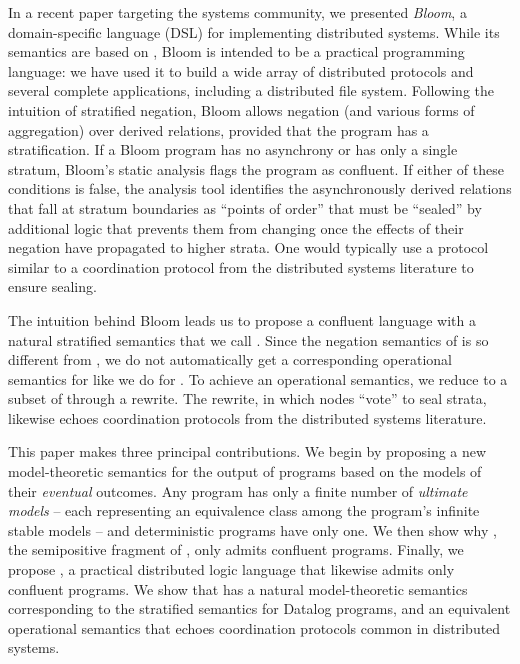 In a recent paper targeting the systems community, we presented \emph{Bloom}, a domain-specific language (DSL) for implementing distributed 
systems.  While its semantics are based on \lang, Bloom is intended to be a practical programming language: we have used it to build a wide array of distributed protocols and several complete
applications, including a distributed file system.
Following the intuition of stratified negation, Bloom allows negation (and various forms of aggregation) over derived relations, provided that the program has a stratification.
If a Bloom program has no asynchrony or has only a single stratum, Bloom's static analysis flags the 
program as confluent.  If either of these conditions is false, the analysis tool identifies the asynchronously derived relations that fall 
at stratum boundaries as ``points of order'' that must be ``sealed'' by additional logic that prevents them from changing once the effects 
of their negation have propagated to higher strata.  One would typically use a protocol similar to a coordination protocol from the distributed systems literature to ensure sealing.

The intuition behind Bloom leads us to propose a confluent language with a natural stratified semantics that we call \plang.  Since the negation semantics of \plang is so different from \lang, we do not automatically get a corresponding operational semantics for \plang like we do for \slang.  To achieve an operational semantics, we reduce \plang to a subset of \lang through a rewrite.  The rewrite, in which nodes ``vote'' to seal strata, likewise echoes coordination protocols from the distributed systems literature.

This paper makes three principal contributions.  We begin by proposing a new model-theoretic semantics for the output of \dedalus 
programs based on the models of their \emph{eventual} outcomes.  
Any \lang program has only a finite number of \emph{ultimate models} -- each representing an equivalence class among the program's infinite stable
models -- and deterministic programs have only one.
We then show why \slang, the semipositive fragment of \lang, only admits confluent programs.  Finally, we propose \plang, a practical distributed logic language that likewise admits only confluent programs.
We show that \plang has a natural model-theoretic semantics corresponding to the stratified semantics for Datalog programs, and an equivalent operational semantics that echoes coordination protocols common in distributed systems.
